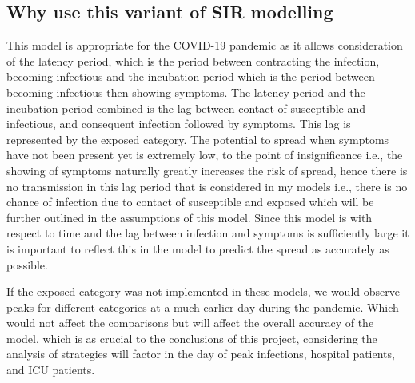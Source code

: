 \documentclass[11pt]{article}
\begin{document}
\subsection{Why use this variant of SIR modelling}
This model is appropriate for the COVID-19 pandemic as it allows consideration of the latency period, which is the period between contracting the infection, becoming infectious and the incubation period which is the period between becoming infectious then showing symptoms. The latency period and the incubation period combined is the lag between contact of susceptible and infectious, and consequent infection followed  by symptoms. This lag is represented by the exposed category. The potential to spread when symptoms have not been present yet is extremely low, to the point of insignificance i.e., the showing of symptoms naturally greatly increases the risk of spread\citep{ spreadofCOVID-19}, hence there is no transmission in this lag period that is considered in my models i.e., there is no chance of infection due to contact of susceptible and exposed which will be further outlined in the assumptions of this model. Since this model is with respect to time and the lag between infection and symptoms is sufficiently large\citep{10.1093/cid/ciab746} it is important to reflect this in the model to predict the spread as accurately as possible. \par
If the exposed category was not implemented in these models, we would observe peaks for different categories at a much earlier day during the pandemic. Which would not affect the comparisons but will affect the overall accuracy of the model, which is as crucial to the conclusions of this project, considering the analysis of strategies will factor in the day of peak infections, hospital patients, and ICU patients.
\end{document}
